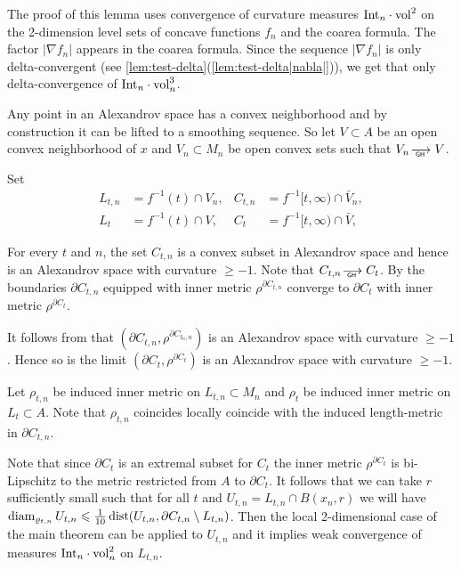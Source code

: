 The proof of this lemma uses 
convergence of curvature measures
$\Int_n\cdot \vol^2$
on  the 2-dimension level sets of concave functions $f_n$ and the coarea formula.
The factor $|\nabla f_n|$ appears in the coarea formula.
Since the sequence $|\nabla f_n|$ is only delta-convergent (see \ref{lem:test-delta}(\ref{lem:test-delta|nabla|})), we get that only delta-convergence of $\Int_n\cdot \vol^3_n$.

Any point  in an Alexandrov space
has a convex neighborhood \cite{petrunin-conc} and by
construction  it can be lifted  to a smoothing sequence.
So let 
$V\subset A$ be an open  convex
neighborhood of $x$ and
$ V_n\subset M_n$
be open convex sets such that
$V_n  \GHto   V$.

Set
\begin{align*}
L_{t,n}&=f^{-1}(t)\cap V_n,&
C_{t,n}&=f^{-1}[t,\infty)\cap \bar V_n,
\\
L_{t}&=f^{-1}(t)\cap V,&
C_{t}&=f^{-1}[t,\infty)\cap \bar V,
\end{align*}


For every $t$ and $n$, the set $C_{t,n}$ is a convex subset in Alexandrov space 
 and hence is an Alexandrov space 
 with curvature $\ge -1$.
Note that
$C_{t,n} \GHto C_{t}$. 
By \cite[Theorem 1.2]{petrunin-QG}
the boundaries $\partial C_{t, n}  $ equipped with inner metric
 $\rho^{\partial C_{t,n}}$ converge to
 $\partial C_{t}  $ with inner metric
 $\rho^{\partial C_{t}}$.
 
 
It follows from \cite{AKP-buyalo} that
$(\partial C_{t,n}, \rho^{\partial C_{t_n,n}}) $ is
an Alexandrov space 
with curvature $\ge -1$.
Hence so is the limit
$(\partial C_{t}, \rho^{\partial C_{t}}) $ is
an Alexandrov space 
 with curvature $\ge -1$.

Let $\rho_{t,n}$ be induced inner metric on $L_{t,n}\subset M_n$ and $\rho_{t}$ be induced inner metric on $L_{t}\subset A$.
Note that $\rho_{t,n}$ coincides locally coincide with the induced length-metric in 
$\partial C_{t,n}$.

Note that since 
$\partial C_{t}$
is an extremal subset for
$C_{t}$
 the inner metric
$ \rho^{\partial C_{t}} $ is bi-Lipschitz to %
the metric restricted from $A$ to
$\partial C_{t}$.
It follows that
we can take $r$ sufficiently small
such that for all $t$ and
$U_{t,n}=L_{t,n}\cap B(x_n,r)$
we will have
$\operatorname{diam}_{\varrho_{t,n}} U_{t,n}\leqslant \tfrac 1{10} \operatorname{\rm dist}   (U_{t,n},\partial C_{t,n}\setminus L_{t,n})$.
Then the local 2-dimensional case of the main theorem can be applied to $U_{t,n}$ and it implies weak convergence of measures  $\Int_n\cdot \vol^2_n$ on $L_{t,n}$.

